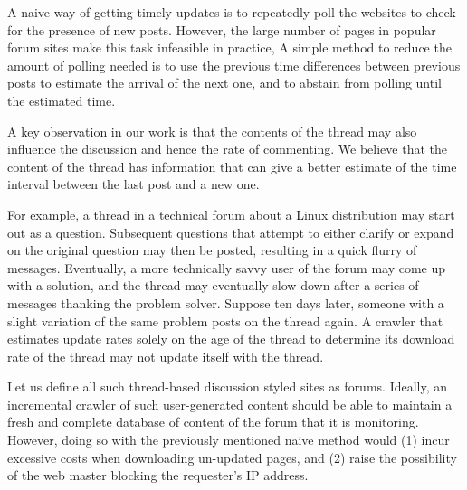  A naive way of getting timely updates is to repeatedly poll the websites 
to check for the presence of new posts. However, the large number of 
pages in popular forum sites make this task infeasible in practice, 
A simple method to reduce the amount of polling needed is to use the
previous time differences between previous posts to estimate the
arrival of the next one, and to abstain from polling until the
estimated time.

A key observation in our work is that the contents of the thread may
also influence the discussion and hence the rate of commenting.  We
believe that the content of the thread has information that can give a
better estimate of the time interval between the last post and a new
one.

 For example, a thread in a technical forum about a Linux distribution may start 
out as a question. Subsequent questions that attempt to either clarify or expand 
on the original question may then be posted, resulting in a quick flurry of 
messages. Eventually, a more technically savvy user of the forum may come up 
with a solution, and the thread may eventually slow down after a series of 
messages thanking the problem solver. 
Suppose ten days later, someone with a 
slight variation of the same problem posts on the thread again. A crawler that 
estimates update rates solely on the age of the thread to determine its download 
rate of the thread may not update itself with the thread.

 Let us define all such thread-based discussion styled sites as forums. Ideally, 
an incremental crawler of such user-generated content should be able to maintain 
a fresh and complete database of content of the forum that it is monitoring.  
However, doing so with the previously mentioned naive method would (1) incur 
excessive costs when downloading un-updated pages, and (2) raise the possibility 
of the web master blocking the requester's IP address.

